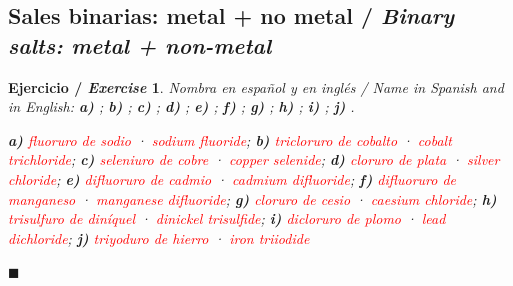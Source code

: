 \documentclass[12pt]{article}
\theoremstyle{mygreennumbox}
\newtheorem{ejercicioT}{Ejercicio / \textit{Exercise}}[section]
\newenvironment{exercise}{\begin{eBoxmygreen}\begin{ejercicioT}}{\hfill{\color{mygreen}\tiny\ensuremath{\blacksquare}}\end{ejercicioT}\end{eBoxmygreen}}
\newcommand{\en}[1]{\textit{#1}}
\begin{document}
\subsection{Sales binarias: metal + no metal / \en{Binary salts: metal + non-metal}}

\begin{exercise}
    Nombra en español y en inglés / \en{Name in Spanish and in English}: \textbf{a)} ; \textbf{b)} ; \textbf{c)} ; \textbf{d)} ; \textbf{e)} ; \textbf{f)} ; \textbf{g)} ; \textbf{h)} ; \textbf{i)} ; \textbf{j)} .
    \begin{solu}
        \textbf{a)} \textcolor{red}{fluoruro de sodio} · \textcolor{red}{\en{sodium fluoride}}; \textbf{b)} \textcolor{red}{tricloruro de cobalto} · \textcolor{red}{\en{cobalt trichloride}}; \textbf{c)} \textcolor{red}{seleniuro de cobre} · \textcolor{red}{\en{copper selenide}}; \textbf{d)} \textcolor{red}{cloruro de plata} · \textcolor{red}{\en{silver chloride}}; \textbf{e)} \textcolor{red}{difluoruro de cadmio} · \textcolor{red}{\en{cadmium difluoride}}; \textbf{f)} \textcolor{red}{difluoruro de manganeso} · \textcolor{red}{\en{manganese difluoride}}; \textbf{g)} \textcolor{red}{cloruro de cesio} · \textcolor{red}{\en{caesium chloride}}; \textbf{h)} \textcolor{red}{trisulfuro de diníquel} · \textcolor{red}{\en{dinickel trisulfide}}; \textbf{i)} \textcolor{red}{dicloruro de plomo} · \textcolor{red}{\en{lead dichloride}}; \textbf{j)} \textcolor{red}{triyoduro de hierro} · \textcolor{red}{\en{iron triiodide}}
    \end{solu}
\end{exercise}
\end{document}
